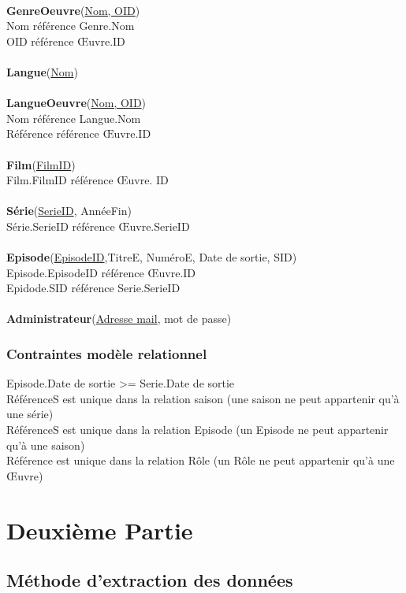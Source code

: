 \documentclass[10pt,a4paper]{article}
\begin{document}
\\
\textbf{GenreOeuvre}(\underline{Nom, OID})
\\
		Nom référence Genre.Nom
    \\
		OID référence Œuvre.ID
\\
\\
\textbf{Langue}(\underline{Nom})
\\
\\
\textbf{LangueOeuvre}(\underline{Nom, OID})
\\
	Nom référence Langue.Nom
    \\
	Référence référence Œuvre.ID
\\
\\
\textbf{Film}(\underline{FilmID})
\\
	Film.FilmID référence Œuvre. ID
\\
\\
\textbf{Série}(\underline{SerieID}, AnnéeFin)
\\
	Série.SerieID référence Œuvre.SerieID
\\
\\
\textbf{Episode}(\underline{EpisodeID},TitreE, NuméroE, Date de sortie, SID)
\\
		Episode.EpisodeID référence Œuvre.ID
        \\
		Epidode.SID référence Serie.SerieID
\\
\\
\textbf{Administrateur}(\underline{Adresse mail}, mot de passe)
\subsubsection{Contraintes modèle relationnel}
\noindent Episode.Date de sortie >= Serie.Date de sortie \\
RéférenceS est unique dans la relation saison (une saison ne peut appartenir qu’à une série) \\
RéférenceS est unique dans la relation Episode (un Episode ne peut appartenir qu’à une saison) \\
Référence est unique dans la relation Rôle (un Rôle ne peut appartenir qu’à une Œuvre)

\newpage
\section{Deuxième Partie}\label{deuxieme partie}

\subsection{Méthode d'extraction des données}
\end{document}
